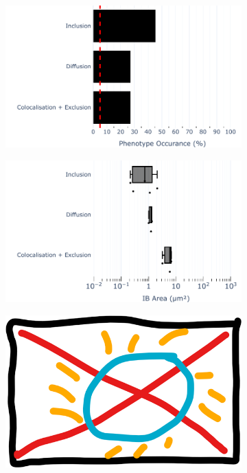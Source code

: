 \begin{figure}
    \begin{subfigure}{0.5\textwidth}
        \caption{}
        \includegraphics[width=1\linewidth]{09. Chapter 4/Figs/04. Overexpression/03. IFIT5/01. bar_i5_hrsv.pdf} 
    \end{subfigure}
    \begin{subfigure}{0.5\textwidth}
        \caption{}
        \includegraphics[width=1\linewidth]{09. Chapter 4/Figs/04. Overexpression/03. IFIT5/02. box_i5_hrsv.pdf}
    \end{subfigure}
    \begin{subfigure}{1\textwidth}
        \centering
        \caption{}
        \includegraphics[width=1\linewidth]{09. Chapter 4/Figs/00. placeholder.png}

\end{subfigure}
\end{figure}
